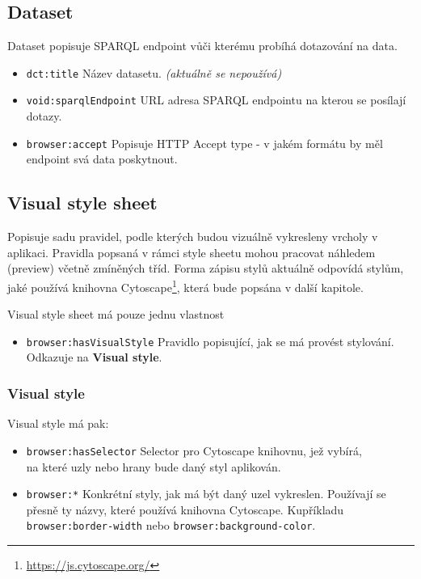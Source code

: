 \subsection{Dataset} \label{pozadavky-dataset}
Dataset popisuje SPARQL endpoint vůči kterému probíhá dotazování na data.

\begin{itemize}
    \item \texttt{dct:title} Název datasetu. \textit{(aktuálně se nepoužívá)}
    \item \texttt{void:sparqlEndpoint} URL adresa SPARQL endpointu na kterou se posílají dotazy.
    \item \texttt{browser:accept} Popisuje HTTP Accept type - v jakém formátu by měl endpoint svá data poskytnout.
\end{itemize}

\subsection{Visual style sheet} \label{pozadavky-visual-style-sheet}
Popisuje sadu pravidel, podle kterých budou vizuálně vykresleny vrcholy v aplikaci. Pravidla popsaná v rámci style sheetu mohou pracovat náhledem (preview) včetně zmíněných tříd. Forma zápisu stylů aktuálně odpovídá stylům, jaké používá knihovna Cytoscape\footnote{\url{https://js.cytoscape.org/}}, která bude popsána v další kapitole.

Visual style sheet má pouze jednu vlastnost

\begin{itemize}
    \item \texttt{browser:hasVisualStyle} Pravidlo popisující, jak se má provést stylování. Odkazuje na \textbf{Visual style}.
\end{itemize}

\subsubsection{Visual style}
Visual style má pak:

\begin{itemize}
    \item \texttt{browser:hasSelector} Selector pro Cytoscape knihovnu, jež vybírá, \\ na které uzly nebo hrany bude daný styl aplikován.
    \item \texttt{browser:*} Konkrétní styly, jak má být daný uzel vykreslen. Používají se přesně ty názvy, které používá knihovna Cytoscape. Kupříkladu \\\texttt{browser:border-width} nebo \texttt{browser:background-color}.
\end{itemize}

